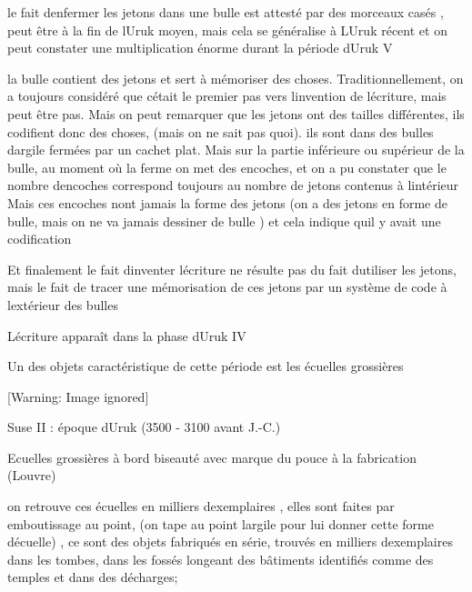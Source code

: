 \documentclass{article}
\begin{document}
le fait d{\textquotesingle}enfermer les jetons dans une bulle est
attesté par des morceaux casés , peut être à la fin de
l{\textquotesingle}Uruk moyen, mais cela se généralise à
L{\textquotesingle}Uruk récent et on peut constater une multiplication
énorme durant la période d{\textquotesingle}Uruk V

la bulle contient des jetons et sert à mémoriser des choses.
Traditionnellement, on a toujours considéré que
c{\textquotesingle}était le premier pas vers
l{\textquotesingle}invention de l{\textquotesingle}écriture, mais peut
être pas. Mais on peut remarquer que les jetons ont des tailles
différentes, ils codifient donc des choses, (mais on ne sait pas quoi).
ils sont dans des bulles d{\textquotesingle}argile fermées par un
cachet plat. Mais sur la partie inférieure ou supérieur de la bulle, au
moment où la ferme on met des encoches, et on a pu constater que le
nombre d{\textquotesingle}encoches correspond toujours au nombre de
jetons contenus à l{\textquotesingle}intérieur Mais ces encoches
n{\textquotesingle}ont jamais la forme des jetons  (on a des jetons en
forme de bulle, mais on ne va jamais dessiner de bulle ) et cela
indique qu{\textquotesingle}il y avait une codification

Et finalement le fait d{\textquotesingle}inventer
l{\textquotesingle}écriture ne résulte pas du fait
d{\textquotesingle}utiliser les jetons, mais le fait de tracer une
mémorisation de ces jetons par un système de code à
l{\textquotesingle}extérieur des bulles

L{\textquotesingle}écriture apparaît dans la phase
d{\textquotesingle}Uruk IV

Un des objets caractéristique de cette période est les écuelles
grossières

\newline


\begin{center}
 [Warning: Image ignored] %

\end{center}
Suse II : époque d{\textquotesingle}Uruk (3500 - 3100 avant J.-C.) 

Ecuelles grossières à bord biseauté avec marque du pouce à la
fabrication  (Louvre)

on retrouve ces écuelles en milliers d{\textquotesingle}exemplaires ,
elles sont faites par emboutissage au point,  (on tape au point
l{\textquotesingle}argile pour lui donner cette forme
d{\textquotesingle}écuelle) , ce sont des objets fabriqués en série,
trouvés en milliers d{\textquotesingle}exemplaires dans les tombes,
dans les fossés longeant des bâtiments identifiés comme des temples et
dans des décharges;
\end{document}
